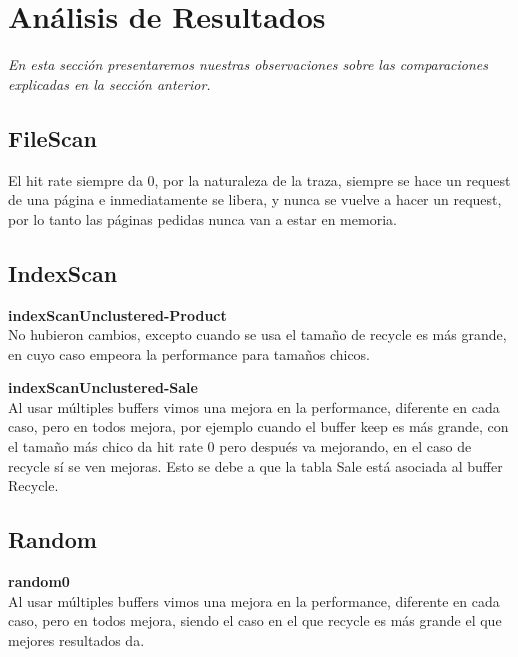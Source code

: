 \section{Análisis de Resultados}

\textsl{En esta secci\'on presentaremos nuestras observaciones
sobre las comparaciones explicadas en la secci\'on anterior.}

\vspace*{0.5cm}

\subsection{FileScan}

El hit rate siempre da 0, por la naturaleza de la traza, siempre se
hace un request de una página e inmediatamente se libera, y nunca 
se vuelve a hacer un request, por lo tanto las páginas pedidas
nunca van a estar en memoria.

\subsection{IndexScan}

\textbf{indexScanUnclustered-Product} \\

No hubieron cambios, excepto cuando se usa el tamaño de recycle es 
más grande, en cuyo caso empeora la performance para tamaños chicos.

\vspace*{0.5cm}

\textbf{indexScanUnclustered-Sale} \\

Al usar múltiples buffers vimos una mejora en la performance, 
diferente en cada caso, pero en todos mejora, por ejemplo cuando
el buffer keep es más grande, con el tamaño más chico da hit rate
0 pero después va mejorando, en el caso de recycle sí se ven mejoras.
Esto se debe a que la tabla Sale está asociada al buffer Recycle. 


\subsection{Random}

\textbf{random0} \\

Al usar múltiples buffers vimos una mejora en la performance, 
diferente en cada caso, pero en todos mejora, siendo el caso
en el que recycle es más grande el que mejores resultados da.

